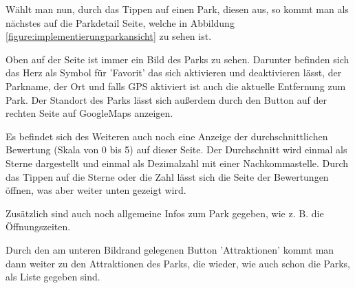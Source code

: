 Wählt man nun, durch das Tippen auf einen Park, diesen aus, so kommt man als nächstes auf die Parkdetail Seite, welche in Abbildung \ref{figure:implementierungparkansicht} zu sehen ist. 

Oben auf der Seite ist immer ein Bild des Parks zu sehen. Darunter befinden sich das Herz als Symbol für 'Favorit' das sich aktivieren und deaktivieren lässt, der Parkname, der Ort und falls GPS aktiviert ist auch die aktuelle Entfernung zum Park. Der Standort des Parks lässt sich außerdem durch den Button auf der rechten Seite auf GoogleMaps anzeigen. 

Es befindet sich des Weiteren auch noch eine Anzeige der durchschnittlichen Bewertung (Skala von 0 bis 5) auf dieser Seite. Der Durchschnitt wird einmal als Sterne dargestellt und einmal als Dezimalzahl mit einer Nachkommastelle. Durch das Tippen auf die Sterne oder die Zahl lässt sich die Seite der Bewertungen öffnen, was aber weiter unten gezeigt wird. 

Zusätzlich sind auch noch allgemeine Infos zum Park gegeben, wie z. B. die Öffnungszeiten. 

Durch den am unteren Bildrand gelegenen Button 'Attraktionen' kommt man dann weiter zu den Attraktionen des Parks, die wieder, wie auch schon die Parks, als Liste gegeben sind.

